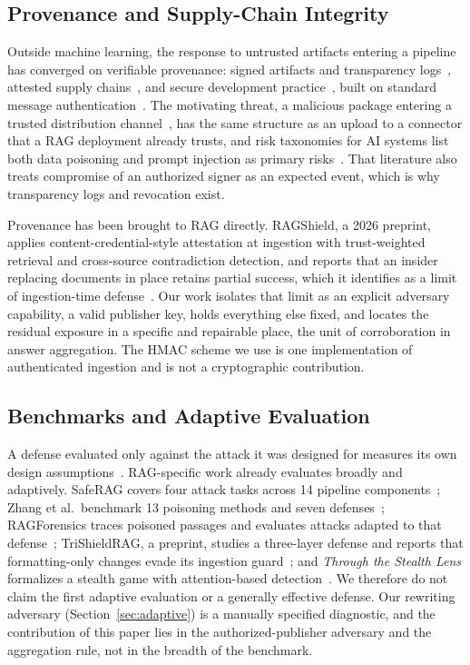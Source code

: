 \documentclass[lettersize,journal]{IEEEtran}
\begin{document}
\subsection{Provenance and Supply-Chain Integrity}

Outside machine learning, the response to untrusted artifacts entering a pipeline has
converged on verifiable provenance: signed artifacts and transparency
logs~\cite{newman2022sigstore}, attested supply chains~\cite{torresarias2019intoto}, and secure
development practice~\cite{nist2022ssdf}, built on standard message
authentication~\cite{krawczyk1997hmac}. The motivating threat, a malicious package entering a
trusted distribution channel~\cite{ohm2020backstabber}, has the same structure as an upload to
a connector that a RAG deployment already trusts, and risk taxonomies for AI systems list both
data poisoning and prompt injection as primary
risks~\cite{vassilev2024nistaml,owasp2025llm}. That literature also treats compromise of an
authorized signer as an expected event, which is why transparency logs and revocation exist.

Provenance has been brought to RAG directly. RAGShield, a 2026 preprint, applies
content-credential-style attestation at ingestion with trust-weighted retrieval and
cross-source contradiction detection, and reports that an insider replacing documents in place
retains partial success, which it identifies as a limit of ingestion-time
defense~\cite{patil2026ragshield}. Our work isolates that limit as an explicit adversary
capability, a valid publisher key, holds everything else fixed, and locates the residual
exposure in a specific and repairable place, the unit of corroboration in answer aggregation.
The HMAC scheme we use is one implementation of authenticated ingestion and is not a
cryptographic contribution.

\subsection{Benchmarks and Adaptive Evaluation}

A defense evaluated only against the attack it was designed for measures its own design
assumptions~\cite{carlini2017bypassing,athalye2018obfuscated,tramer2020adaptive,carlini2019evaluating}.
RAG-specific work already evaluates broadly and adaptively. SafeRAG covers four attack tasks
across 14 pipeline components~\cite{liang2025saferag}; Zhang et al.\ benchmark 13 poisoning
methods and seven defenses~\cite{zhang2025benchmark}; RAGForensics traces poisoned passages and
evaluates attacks adapted to that defense~\cite{zhang2025ragforensics}; TriShieldRAG, a
preprint, studies a three-layer defense and reports that formatting-only changes evade its
ingestion guard~\cite{mohanty2026trishield}; and \emph{Through the Stealth Lens} formalizes a
stealth game with attention-based detection~\cite{choudhary2026stealth}. We therefore do not
claim the first adaptive evaluation or a generally effective defense. Our rewriting adversary
(Section~\ref{sec:adaptive}) is a manually specified diagnostic, and the contribution of this
paper lies in the authorized-publisher adversary and the aggregation rule, not in the breadth
of the benchmark.
\end{document}

